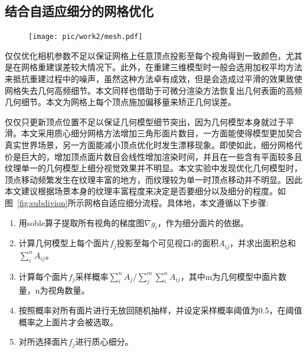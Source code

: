 %
\subsection{结合自适应细分的网格优化}
\begin{figure}[ht]
    \centering

    \texttt{[image: pic/work2/mesh.pdf]}
    \label{fig:mesh}
\end{figure}


仅仅优化相机参数不足以保证网格上任意顶点投影至每个视角得到一致颜色，尤其是在网格重建误差较大情况下。此外，在重建三维模型时一般会选用加权平均方法来抵抗重建过程中的噪声，虽然这种方法卓有成效，但是会造成过平滑的效果致使网格失去几何高频细节。本文同样也借助于可微分渲染方法恢复出几何表面的高频几何细节。本文为网格上每个顶点施加偏移量来矫正几何误差。\par
仅仅只更新顶点位置不足以保证几何模型细节突出，因为几何模型本身就过于平滑。本文采用质心细分网格方法增加三角形面片数目，一方面能使得模型更加契合真实世界场景，另一方面能减小顶点优化时发生漂移现象。即使如此，细分网格代价是巨大的，增加顶点面片数目会线性增加渲染时间，并且在一些含有平面较多且纹理单一的几何模型上细分视觉效果并不明显。本文实验中发现优化几何模型时，顶点移动频繁发生在纹理丰富的地方，而纹理较为单一时顶点移动并不明显。因此本文建议根据场景本身的纹理丰富程度来决定是否要细分以及细分的程度。如图~\ref{fig:subdivion}所示网格自适应细分流程。具体地，本文遵循以下步骤:
\begin{enumerate}
	\item 用soble算子提取所有视角的梯度图$\nabla g_i$，作为细分面片的依据。
	\item 计算几何模型上每个面片$f_j$投影至每个可见视口$i$的面积$A_{ij}$，并求出面积总和$\sum_{i}^{n} A_{ij}$。
	\item 计算每个面片$f_j$采样概率$\sum_{i}^{n} A_{j} / \sum_{j}^{m}\sum_{i}^{n} A_{ij}$，其中m为几何模型中面片数量，n为视角数量。
	\item 按照概率对所有面片进行无放回随机抽样，并设定采样概率阈值为0.5，在阈值概率之上面片才会被选取。
	\item 对所选择面片$f_j$进行质心细分。
\end{enumerate}

